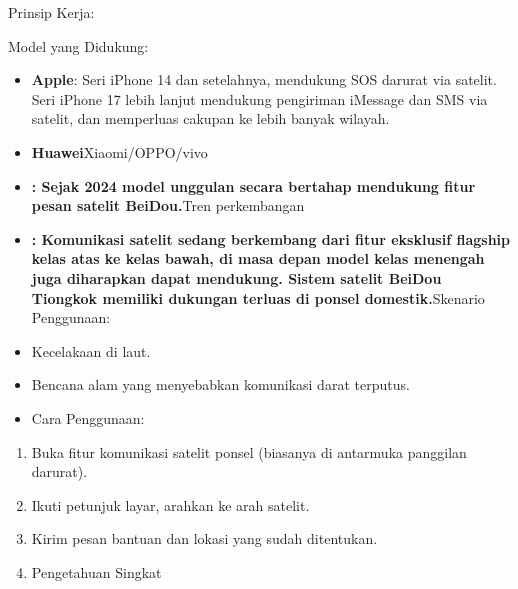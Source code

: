 


Prinsip Kerja:


Model yang Didukung:


\begin{itemize}
  \item \textbf{Apple}: Seri iPhone 14 dan setelahnya, mendukung SOS darurat via satelit. Seri iPhone 17 lebih lanjut mendukung pengiriman iMessage dan SMS via satelit, dan memperluas cakupan ke lebih banyak wilayah.
  \item \textbf{Huawei}Xiaomi/OPPO/vivo
  \item \textbf{: Sejak 2024 model unggulan secara bertahap mendukung fitur pesan satelit BeiDou.}Tren perkembangan
  \item \textbf{: Komunikasi satelit sedang berkembang dari fitur eksklusif flagship kelas atas ke kelas bawah, di masa depan model kelas menengah juga diharapkan dapat mendukung. Sistem satelit BeiDou Tiongkok memiliki dukungan terluas di ponsel domestik.}Skenario Penggunaan:
\end{itemize}


\begin{itemize}
  \item Kecelakaan di laut.
  \item Bencana alam yang menyebabkan komunikasi darat terputus.
  \item Cara Penggunaan:
\end{itemize}


\begin{enumerate}
  \item Buka fitur komunikasi satelit ponsel (biasanya di antarmuka panggilan darurat).
  \item Ikuti petunjuk layar, arahkan ke arah satelit.
  \item Kirim pesan bantuan dan lokasi yang sudah ditentukan.
  \item Pengetahuan Singkat
\end{enumerate}

